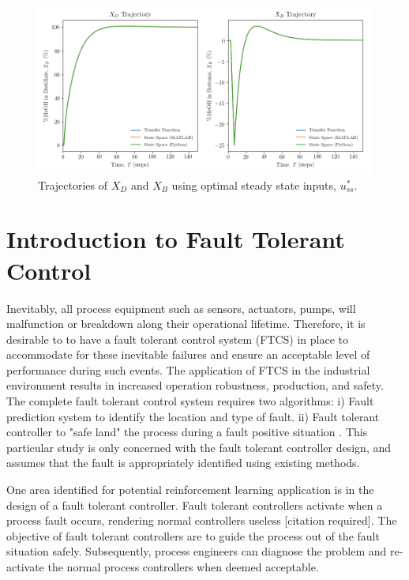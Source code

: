 \begin{figure}[h]
     \centering
      \includegraphics[scale=0.42]{images/optimal_input_plots.png}
     \caption{Trajectories of $X_D$ and $X_B$ using optimal steady state inputs, $u_{ss}^*.$}
     \label{fig: optimal_ss_xd_xb}
\end{figure}

\section{Introduction to Fault Tolerant Control}

Inevitably, all process equipment such as sensors, actuators, pumps, will malfunction or breakdown along their operational lifetime. Therefore, it is desirable to to have a fault tolerant control system (FTCS) in place to accommodate for these inevitable failures and ensure an acceptable level of performance during such events. The application of FTCS in the industrial environment results in increased operation robustness, production, and safety. The complete fault tolerant control system requires two algorithms: i) Fault prediction system to identify the location and type of fault. ii) Fault tolerant controller to "safe land" the process during a fault positive situation \cite{process_faults}.  This particular study is only concerned with the fault tolerant controller design, and assumes that the fault is appropriately identified using existing methods.

One area identified for potential reinforcement learning application is in the design of a fault tolerant controller.  Fault tolerant controllers activate when a process fault occurs, rendering normal controllers useless [citation required]. The objective of fault tolerant controllers are to guide the process out of the fault situation safely.  Subsequently, process engineers can diagnose the problem and re-activate the normal process controllers when deemed acceptable.  

